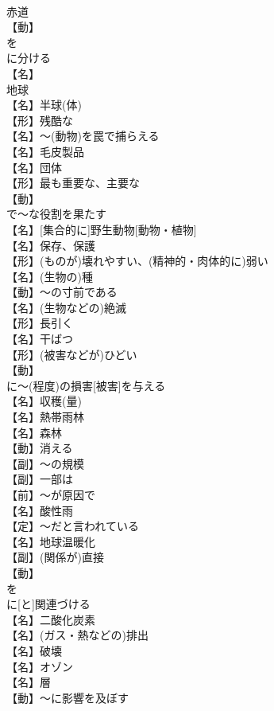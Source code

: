 \documentclass[8pt]{extreport}
\begin{document}
\begin{CJK}{UTF8}{min}
\\	赤道
\\	【動】
\\	を
\\	に分ける
\\	【名】
\\	地球
\\	【名】半球(体)
\\	【形】残酷な
\\	【名】～(動物)を罠で捕らえる
\\	【名】毛皮製品
\\	【名】団体
\\	【形】最も重要な、主要な
\\	【動】
\\	で～な役割を果たす
\\	【名】[集合的に]野生動物[動物・植物]
\\	【名】保存、保護
\\	【形】(ものが)壊れやすい、(精神的・肉体的に)弱い
\\	【名】(生物の)種
\\	【動】～の寸前である
\\	【名】(生物などの)絶滅
\\	【形】長引く
\\	【名】干ばつ
\\	【形】(被害などが)ひどい
\\	【動】
\\	に～(程度)の損害[被害]を与える
\\	【名】収穫(量)
\\	【名】熱帯雨林
\\	【名】森林
\\	【動】消える
\\	【副】～の規模
\\	【副】一部は
\\	【前】～が原因で
\\	【名】酸性雨
\\	【定】～だと言われている
\\	【名】地球温暖化
\\	【副】(関係が)直接
\\	【動】
\\	を
\\	に[と]関連づける
\\	【名】二酸化炭素
\\	【名】(ガス・熱などの)排出
\\	【名】破壊
\\	【名】オゾン
\\	【名】層
\\	【動】～に影響を及ぼす

\end{CJK}
\end{document}
